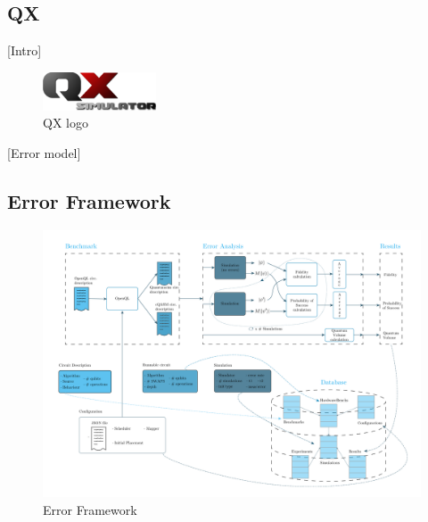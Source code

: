 \subsection*{QX}
\label{sec:org842cefa}

[Intro]

\begin{figure}[htbp]
\centering
\includegraphics[width=0.3\textwidth]{figures/qx.png}
\caption{\label{fig:orga6135ad}
QX logo}
\end{figure}

[Error model]

\subsection*{Error Framework}
\label{sec:orgc1910c0}
\begin{figure}[htbp]
\centering
\includegraphics[width=\textwidth]{figures/error_framework_diagram.png}
\caption{\label{fig:org23eae94}
Error Framework}
\end{figure}

